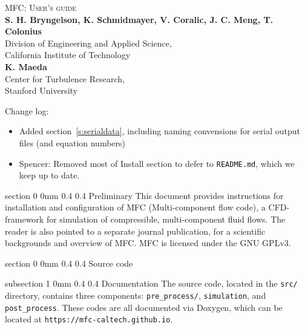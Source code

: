 \documentclass[11pt]{article}
\makeatletter
\renewcommand{\section}{\@startsection
{section}%
{0}%
{0mm}%
{0.4\baselineskip}%
{0.4\baselineskip}%
{\normalfont\Large\bfseries\color{myBrown}}}%
\renewcommand{\subsection}{\@startsection
{subsection}%
{1}%
{0mm}%
{0.4\baselineskip}%
{0.4\baselineskip}%
{\normalfont\large\bfseries\color{myBrown}}}%
\newcommand{\cPI}[1]{\textbf{\color{myBrown}#1}}
\makeatother
\begin{document}
\begin{center}
\vspace*{1.5in}

\textsc{\color{myBrown} \huge MFC: User's guide}\\
\bigskip
\bigskip
\cPI{S. H. Bryngelson, K. Schmidmayer, V. Coralic, J. C. Meng, T. Colonius}\\
\smallskip
{\color{myTan} Division of Engineering and Applied Science, \\ California Institute of Technology} \\
\medskip
\cPI{K. Maeda}\\
\smallskip
{\color{myTan} Center for Turbulence Research, \\ Stanford University} 
\end{center}

\bigskip\bigskip
Change log:
\begin{itemize}
    \item Added section~\ref{s:serialdata}, including naming convensions for serial output files (and equation numbers) 
    \item Spencer: Removed most of Install section to defer to \texttt{README.md}, which we keep up to date. 
\end{itemize}


\newpage
\setcounter{page}{1}
\pagestyle{plain}

\tableofcontents
\newpage

\sloppy
\section{Preliminary}
This document provides instructions for installation and configuration of MFC (Multi-component flow code), a CFD-framework for simulation of compressible, multi-component fluid flows.
The reader is also pointed to a separate journal publication, \citet{Bryngelson19} for a scientific backgrounds and overview of MFC. 
MFC is licensed under the GNU GPLv3.

\section{Source code}

\subsection{Documentation}
The source code, located in the \texttt{src/} directory, 
contains three components: \texttt{pre\_process/}, \texttt{simulation},
and \texttt{post\_process}. These codes are all documented
via Doxygen, which can be located at \texttt{https://mfc-caltech.github.io}. 
\end{document}

